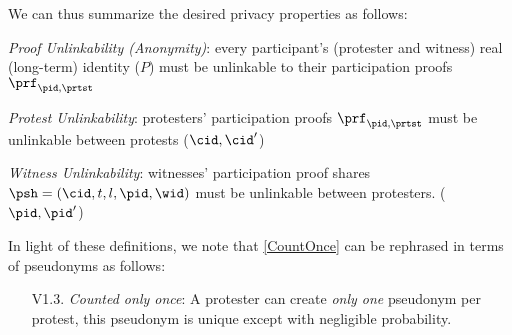 We can thus summarize the desired privacy properties as follows:
\begin{requirements}[P]
\item\label{ProofUnlink} \emph{Proof Unlinkability (Anonymity)}: every 
  participant's (protester and witness) real (long-term) identity (\(P\)) must 
  be unlinkable to their participation proofs \(\prf_{\pid, \prtst}\)
\item\label{ProtestUnlink} \emph{Protest Unlinkability}: protesters' participation proofs \(\prf_{\pid, \prtst}\) must be unlinkable between protests (\(\cid, \cid' \))
\item\label{WitnessUnlink}\emph{Witness Unlinkability}:  witnesses' participation proof shares \(\psh = (\cid, t, l, \pid,\wid)\) must be unlinkable between protesters. (\(\pid, \pid' \))
\end{requirements}

In light of these definitions, we note that \cref{CountOnce} can be rephrased 
in terms of pseudonyms as follows:
\begin{enumerate}
  \item[V1.3.] \emph{Counted only once}:
    A protester can create \emph{only one} pseudonym per protest, this 
    pseudonym is unique except with negligible probability.
\end{enumerate}


